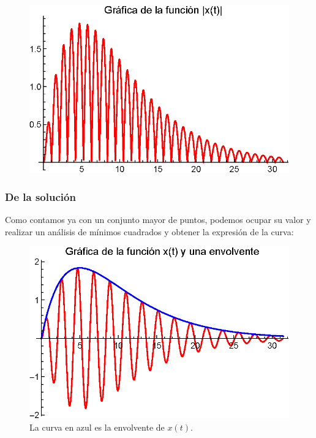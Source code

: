 \begin{frame}[plain]
\begin{figure}[H]
    \centering
    \includegraphics[scale=0.55]{Imagenes/Ejemplo_Resonancia_02.eps}
\end{figure}
\end{frame}
\begin{frame}
\frametitle{De la solución}
Como contamos ya con un conjunto mayor de puntos, podemos ocupar su valor y realizar un análisis de mínimos cuadrados y obtener la expresión de la curva:
\end{frame}
\begin{frame}[plain]
\begin{figure}[H]
    \centering
    \includegraphics[scale=0.55]{Imagenes/Ejemplo_Resonancia_03.eps}
    \caption{La curva en azul es la envolvente de $x(t)$.}
\end{figure}
\end{frame}
